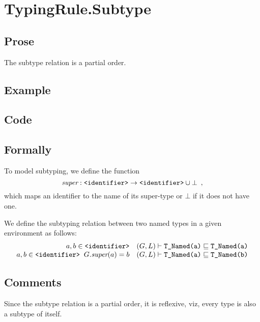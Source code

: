 \documentclass{book}
\begin{document}
\section{TypingRule.Subtype} 

  \subsection{Prose}
    The subtype relation is a partial order.

  \subsection{Example}

  \subsection{Code}
  
\begin{emptyformal}
    \subsection{Formally}
\end{emptyformal}

\newcommand\super[0]{\textit{super}}
	  \newcommand\subtype[0]{\sqsubseteq}

	  To model subtyping, we define the function 
	  \[
	  \super : \identifier \rightarrow \identifier \cup {\bot} \enspace,
	  \]
	  which maps an identifier to the name of its super-type or $\bot$ if it does not have one.

	  We define the subtyping relation between two named types in a given environment as follows:
	  \[
	  \begin{array}{rl}
	  a, b \in \identifier & (G,L) \vdash \texttt{T\_Named(a)} \subtype \texttt{T\_Named(a)} \\  
	  a, b \in \identifier \rulespace G.\super(a) = b  & 
	  (G,L) \vdash \texttt{T\_Named(a)} \subtype \texttt{T\_Named(b)}
	  \end{array}
	  \]
	  
  \subsection{Comments}
  Since the subtype relation is a partial order, it is reflexive, viz, 
  every type is also a subtype of itself.
\end{document}
